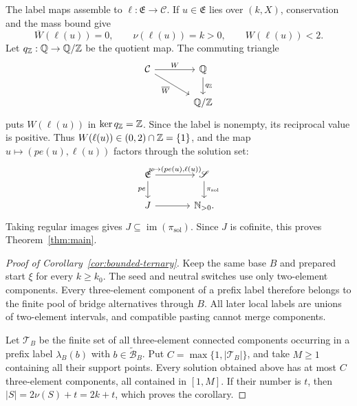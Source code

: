 The label maps assemble to $\ell:\mathfrak E\to\mathcal C$.  If $u\in\mathfrak E$ lies over $(k,X)$, conservation and the mass bound give
\[
\overline W(\ell(u))=0,\qquad
\nu(\ell(u))=k>0,\qquad
W(\ell(u))<2.
\]
Let $q_{\mathbb Z}:\mathbb Q\to\mathbb Q/\mathbb Z$ be the quotient map.  The commuting triangle
\begin{equation}\label{eq:value-residue-square}
\begin{tikzcd}[column sep=large]
\mathcal C \arrow[r,"{W}"] \arrow[dr,"{\overline W}"'] & \Q \arrow[d,"{q_{\Z}}"]\\
  & \Q/\Z
\end{tikzcd}
\end{equation}
puts $W(\ell(u))$ in $\ker q_{\mathbb Z}=\mathbb Z$.  Since the label is nonempty, its reciprocal value is positive.  Thus $W(\ell(u))\in(0,2)\cap\mathbb Z=\{1\}$, and the map $u\mapsto(pe(u),\ell(u))$ factors through the solution set:
\begin{equation}\label{eq:solution-factorization}
\begin{tikzcd}[column sep=large]
\mathfrak E \arrow[r,"{u\mapsto(pe(u),\ell(u))}"] \arrow[d,"{pe}"']
  & \mathscr S \arrow[d,"{\pi_{\mathrm{sol}}}"]\\
J \arrow[r] & \N_{>0}.
\end{tikzcd}
\end{equation}
Taking regular images gives $J\subseteq\operatorname{im}(\pi_{\mathrm{sol}})$.  Since $J$ is cofinite, this proves Theorem~\ref{thm:main}.

\begin{proof}[Proof of Corollary~\ref{cor:bounded-ternary}]
Keep the same base $B$ and prepared start $\xi$ for every $k\ge k_0$.  The seed and neutral switches use only two-element components.  Every three-element component of a prefix label therefore belongs to the finite pool of bridge alternatives through $B$.  All later local labels are unions of two-element intervals, and compatible pasting cannot merge components.

Let $\mathscr T_B$ be the finite set of all three-element connected components occurring in a prefix label $\lambda_B(b)$ with $b\in\widetilde{\mathcal B}_B$.  Put $C=\max\{1,|\mathscr T_B|\}$, and take $M\ge1$ containing all their support points.  Every solution obtained above has at most $C$ three-element components, all contained in $[1,M]$.  If their number is $t$, then $|S|=2\nu(S)+t=2k+t$, which proves the corollary.
\end{proof}
